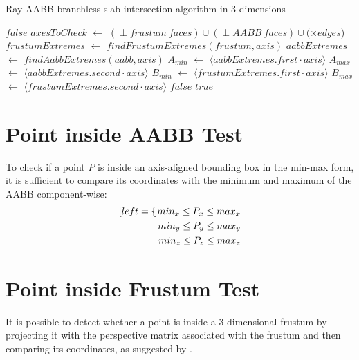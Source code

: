 \documentclass{PoliMi_MasterThesis}
\newcommand*\Let[2]{\State #1 $\gets$ #2}
\begin{document}
\begin{algorithm}[H]
	\caption{Ray-AABB branchless slab intersection algorithm in 3 dimensions}
	\begin{algorithmic}[1]
		 
			\State \Return $false$
		\EndIf
		\Let{$axesToCheck$}{$(\perp frustum \: faces) \cup (\perp AABB \: faces) \cup (\times edges$)}
			\Let{$frustumExtremes$}{$findFrustumExtremes(frustum, axis)$} 
			\Let{$aabbExtremes$}{$findAabbExtremes(aabb, axis)$} 
			\Let{$A_{min}$}{$\langle aabbExtremes.first \cdot axis \rangle$}
			\Let{$A_{max}$}{$\langle aabbExtremes.second \cdot axis \rangle$}
			\Let{$B_{min}$}{$\langle frustumExtremes.first \cdot axis \rangle$}
			\Let{$B_{max}$}{$\langle frustumExtremes.second \cdot axis \rangle$}
				\State \Return $false$
			\EndIf
		\EndFor
		\State \Return $true$ 
		\EndFunction
	\end{algorithmic}
\end{algorithm} 

\section{Point inside AABB Test} \label{sec:point_inside_aabb}
To check if a point $P$ is inside an axis-aligned bounding box in the min-max form, it is sufficient to compare its coordinates with the minimum and maximum of the AABB component-wise:
\begin{subequations}
	\begin{align*}[left=\empheqlbrace]
		min_x \leq P_x \leq max_x \\
		min_y \leq P_y \leq max_y \\
		min_z \leq P_z \leq max_z
	\end{align*}
\end{subequations}

\section{Point inside Frustum Test} \label{sec:point_inside_frustum}
It is possible to detect whether a point is inside a 3-dimensional frustum by projecting it with the perspective matrix associated with the frustum and then comparing its coordinates, as suggested by \cite{point_inside_frustum_test}.
\end{document}
